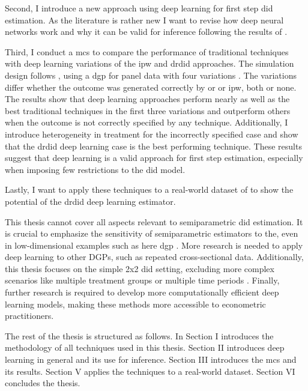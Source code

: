 Second, I introduce a new approach using deep learning for first step \ac{did} estimation.
As the literature is rather new I want to revise how deep neural networks work and why it can be valid for inference following the results of \citet{farrellDeepNeuralNetworks2021}.

Third, I conduct a \ac{mcs} to compare the performance of traditional techniques with deep learning variations of the \ac{ipw} and \ac{drdid} approaches.
The simulation design follows \citet{santannaDoublyRobustDifferenceindifferences2020}, using a \ac{dgp} for panel data with four variations .
The variations differ whether the outcome was generated correctly by \ac{or} or \ac{ipw}, both or none.
The results show that deep learning approaches perform nearly as well as the best traditional techniques in the first three variations and outperform others when the outcome is not correctly specified by any technique.
Additionally, I introduce heterogeneity in treatment for the incorrectly specified case and show that the \ac{drdid} deep learning case is the best performing technique.
These results suggest that deep learning is a valid approach for first step estimation, especially when imposing few restrictions to the \ac{did} model.

Lastly, I want to apply these techniques to a real-world dataset of \citet{favaraCreditSupplyPrice2015} to show the potential of the \ac{drdid} deep learning estimator. %

This thesis cannot cover all aspects relevant to semiparametric \ac{did} estimation.
It is crucial to emphasize the sensitivity of semiparametric estimators to the, even in low-dimensional examples such as here \ac{dgp} \citep{zimmert2018efficient} .
More research is needed to apply deep learning to other DGPs, such as repeated cross-sectional data.
Additionally, this thesis focuses on the simple 2x2 \ac{did} setting, excluding more complex scenarios like multiple treatment groups or multiple time periods \citep[see][]{callawayDifferenceinDifferencesMultipleTime2021,goodman-baconDifferenceindifferencesVariationTreatment2021}.
Finally, further research is required to develop more computationally efficient deep learning models, making these methods more accessible to econometric practitioners.

The rest of the thesis is structured as follows. In Section I introduces the methodology of all techniques used in this thesis.
Section II introduces deep learning in general and its use for inference.
Section III introduces the \ac{mcs} and its results.
Section V applies the techniques to a real-world dataset.
Section VI concludes the thesis.

